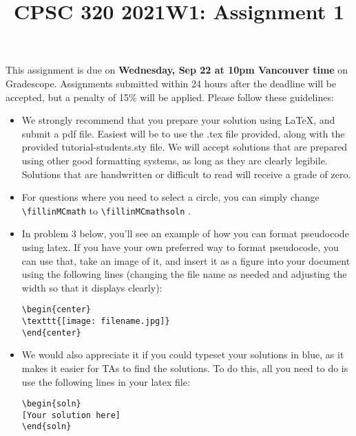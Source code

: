 \documentclass[11pt]{article}
\author{}
\date{}
\newcommand{\fillinMCmath}[1]{\begin{tikzpicture}\draw circle [radius=0.5em];\end{tikzpicture}\ #1}
\newcommand{\fillinMCmathsoln}[1]{\begin{tikzpicture}\draw[black, fill=blue] circle [radius=0.5em];\end{tikzpicture}\ #1}
\begin{document}
\title{CPSC 320 2021W1: Assignment 1}

\maketitle
\vspace{-0.5in}

This assignment is due on \textbf{Wednesday, Sep 22 at 10pm Vancouver time} on Gradescope. Assignments submitted within 24 hours after the deadline will be accepted, but a penalty of 15\% will be applied. Please follow these guidelines:

\begin{itemize}
\item
We strongly recommend that you prepare your solution using \LaTeX, and submit a
pdf file.  Easiest will be to use the .tex file provided, along with the
provided tutorial-students.sty file.
We will accept
solutions that are prepared using other good formatting systems, as
long as they are clearly legibile. Solutions that are handwritten or
difficult to read will receive a grade of zero.

\item
  For
questions where you need to select a circle, you can simply change
\verb~\fillinMCmath~ to \verb~\fillinMCmathsoln~ .
\item
In problem 3 below, you'll see an example of how you can format pseudocode using latex. If you have your own preferred way to format pseudocode, you can use that, take an image of it, and insert it as a figure into your document using the following lines (changing the file name as needed and adjusting the width so that it displays clearly):

\begin{verbatim}
\begin{center}
\texttt{[image: filename.jpg]}
\end{center}
\end{verbatim}

\item
  We would also appreciate it if you could typeset your solutions in blue, as it makes it easier for TAs to find the solutions. To do this, all you need to do is use the following lines in your latex file:

\begin{verbatim}
\begin{soln}
[Your solution here]
\end{soln}
\end{verbatim}


\end{itemize}
\end{document}
